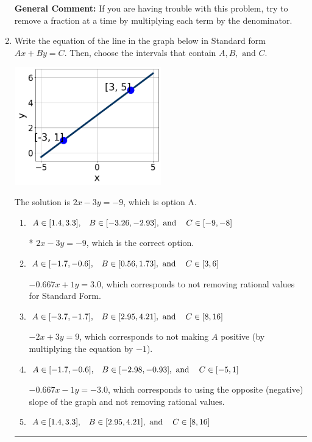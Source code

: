 \documentclass{extbook}[14pt]
\newcommand{\litem}[1]{\item #1

\rule{\textwidth}{0.4pt}}
\begin{document}
\begin{enumerate}
{\textbf{General Comment:} If you are having trouble with this problem, try to remove a fraction at a time by multiplying each term by the denominator.
}
\litem{
Write the equation of the line in the graph below in Standard form $Ax+By=C$. Then, choose the intervals that contain $A, B, \text{ and } C$.

\begin{center}
    \includegraphics[width=0.5\textwidth]{../Figures/linearGraphToStandardA.png}
\end{center}




The solution is \( 2x - 3y = -9 \), which is option A.\begin{enumerate}[label=\Alph*.]
\item \( A \in [1.4, 3.3], \hspace{3mm} B \in [-3.26, -2.93], \text{ and } \hspace{3mm} C \in [-9, -8] \)

* $2x - 3y = -9$, which is the correct option.
\item \( A \in [-1.7, -0.6], \hspace{3mm} B \in [0.56, 1.73], \text{ and } \hspace{3mm} C \in [3, 6] \)

 $-0.667x + 1y = 3.0$, which corresponds to not removing rational values for Standard Form.
\item \( A \in [-3.7, -1.7], \hspace{3mm} B \in [2.95, 4.21], \text{ and } \hspace{3mm} C \in [8, 16] \)

 $-2x + 3y = 9$, which corresponds to not making $A$ positive (by multiplying the equation by $-1$).
\item \( A \in [-1.7, -0.6], \hspace{3mm} B \in [-2.98, -0.93], \text{ and } \hspace{3mm} C \in [-5, 1] \)

 $-0.667x - 1y = -3.0$, which corresponds to using the opposite (negative) slope of the graph and not removing rational values.
\item \( A \in [1.4, 3.3], \hspace{3mm} B \in [2.95, 4.21], \text{ and } \hspace{3mm} C \in [8, 16] \)


\end{enumerate}}
\end{enumerate}
\end{document}
